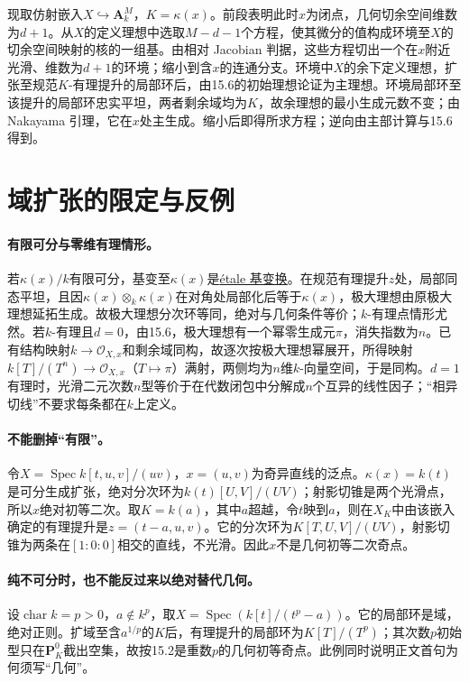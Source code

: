\documentclass[openany,fontset=fandol]{ctexbook}
\newcommand{\OO}{\mathcal O}
\DeclareMathOperator{\Spec}{Spec}
\begin{document}
现取仿射嵌入$X\hookrightarrow\mathbf A^M_k$，$K=\kappa(x)$。前段表明此时$x$为闭点，几何切余空间维数为$d+1$。从$X$的定义理想中选取$M-d-1$个方程，使其微分的值构成环境至$X$的切余空间映射的核的一组基。由相对 Jacobian 判据，这些方程切出一个在$x$附近光滑、维数为$d+1$的环境；缩小到含$x$的连通分支。环境中$X$的余下定义理想，扩张至规范$K$-有理提升的局部环后，由15.6的初始理想论证为主理想。环境局部环至该提升的局部环忠实平坦，两者剩余域均为$K$，故余理想的最小生成元数不变；由 Nakayama 引理，它在$x$处主生成。缩小后即得所求方程；逆向由主部计算与15.6得到。
\section*{域扩张的限定与反例}
\paragraph{有限可分与零维有理情形。}
若$\kappa(x)/k$有限可分，基变至$\kappa(x)$是\href{https://stacks.math.columbia.edu/tag/02GH}{étale 基变换}。在规范有理提升$z$处，局部同态平坦，且因$\kappa(x)\otimes_k\kappa(x)$在对角处局部化后等于$\kappa(x)$，极大理想由原极大理想延拓生成。故极大理想分次环等同，绝对与几何条件等价；$k$-有理点情形尤然。若$k$-有理且$d=0$，由15.6，极大理想有一个幂零生成元$\pi$，消失指数为$n$。已有结构映射$k\to\OO_{X,x}$和剩余域同构，故逐次按极大理想幂展开，所得映射$k[T]/(T^n)\to\OO_{X,x}$（$T\mapsto\pi$）满射，两侧均为$n$维$k$-向量空间，于是同构。$d=1$有理时，光滑二元次数$n$型等价于在代数闭包中分解成$n$个互异的线性因子；“相异切线”不要求每条都在$k$上定义。

\paragraph{不能删掉“有限”。}
令$X=\Spec k[t,u,v]/(uv)$，$x=(u,v)$为奇异直线的泛点。$\kappa(x)=k(t)$是可分生成扩张，绝对分次环为$k(t)[U,V]/(UV)$；射影切锥是两个光滑点，所以$x$绝对初等二次。取$K=k(a)$，其中$a$超越，令$t$映到$a$，则在$X_K$中由该嵌入确定的有理提升是$z=(t-a,u,v)$。它的分次环为$K[T,U,V]/(UV)$，射影切锥为两条在$[1:0:0]$相交的直线，不光滑。因此$x$不是几何初等二次奇点。

\paragraph{纯不可分时，也不能反过来以绝对替代几何。}
设$\operatorname{char}k=p>0$，$a\notin k^p$，取$X=\Spec(k[t]/(t^p-a))$。它的局部环是域，绝对正则。扩域至含$a^{1/p}$的$K$后，有理提升的局部环为$K[T]/(T^p)$；其次数$p$初始型只在$\mathbf P^0_K$截出空集，故按15.2是重数$p$的几何初等奇点。此例同时说明正文首句为何须写“几何”。
\end{document}
